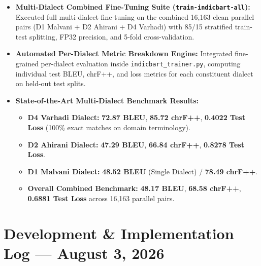\documentclass[10pt]{article}
\begin{document}
\begin{itemize}
  \item \textbf{Multi-Dialect Combined Fine-Tuning Suite (\texttt{train-indicbart-all}):} Executed full multi-dialect fine-tuning on the combined 16,163 clean parallel pairs (D1 Malvani + D2 Ahirani + D4 Varhadi) with 85/15 stratified train-test splitting, FP32 precision, and 5-fold cross-validation.
  \item \textbf{Automated Per-Dialect Metric Breakdown Engine:} Integrated fine-grained per-dialect evaluation inside \texttt{indicbart\_trainer.py}, computing individual test BLEU, chrF++, and loss metrics for each constituent dialect on held-out test splits.
  \item \textbf{State-of-the-Art Multi-Dialect Benchmark Results:}
    \begin{itemize}
      \item \textbf{D4 Varhadi Dialect:} \textbf{72.87 BLEU}, \textbf{85.72 chrF++}, \textbf{0.4022 Test Loss} (100\% exact matches on domain terminology).
      \item \textbf{D2 Ahirani Dialect:} \textbf{47.29 BLEU}, \textbf{66.84 chrF++}, \textbf{0.8278 Test Loss}.
      \item \textbf{D1 Malvani Dialect:} \textbf{48.52 BLEU} (Single Dialect) / \textbf{78.49 chrF++}.
      \item \textbf{Overall Combined Benchmark:} \textbf{48.17 BLEU}, \textbf{68.58 chrF++}, \textbf{0.6881 Test Loss} across 16,163 parallel pairs.
    \end{itemize}
\end{itemize}

\section*{Development \& Implementation Log --- August 3, 2026}
\end{document}
